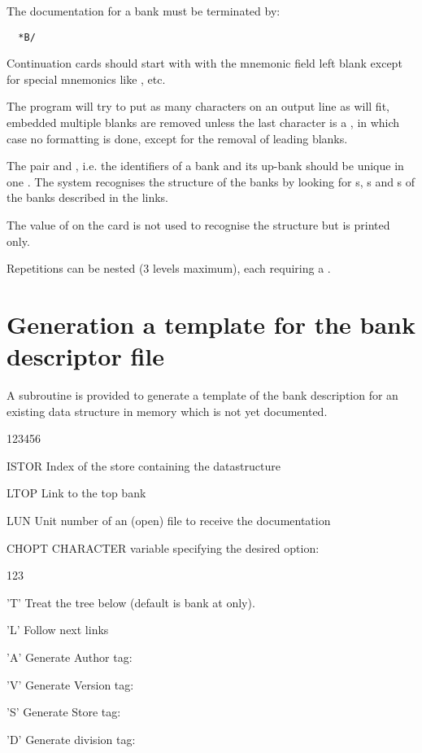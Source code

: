 The documentation for a bank must be terminated by:
\begin{verbatim}
  *B/
\end{verbatim}
 
\begin{Notes}
\item Continuation cards should start with  with the mnemonic field
      left blank except for special mnemonics like , 
       etc.
\item The program will try to put as many characters on an output line as
      will fit, embedded multiple blanks are removed unless the last 
      character is a , in
      which case no formatting is done, except for the removal of leading blanks.
\item The pair  and , i.e. the identifiers of a bank and
      its up-bank should be unique in one \RZfile. 
      The system recognises the structure of the banks by looking for 
      s, s and s of the banks described in the links. 
\item The value of  on the card 
      is not used to recognise the structure but is printed only.
\item Repetitions can be nested (3 levels maximum), 
      each  requiring a .
\end{Notes}
 
\section{Generation a template for the bank descriptor file}
\label{sec:dzdocdzdtmp}  
 
A subroutine is provided to generate a template of the bank
description for an existing
data structure in memory which is not yet documented.
 
 
\Idesc
\begin{DLtt}{123456}
\item[ISTOR] Index of the store containing the datastructure
\item[LTOP]  Link to the top bank
\item[LUN]   Unit number of an (open) file to receive the documentation
\item[CHOPT] CHARACTER variable specifying the desired option:
\begin{DLtt}{123}
\item['T'] Treat the tree below  
           (default is bank at  only).
\item['L'] Follow next links
\item['A'] Generate Author tag: 
\item['V'] Generate Version tag: 
\item['S'] Generate Store tag:   
\item['D'] Generate division tag: 
\end{DLtt} 
\end{DLtt} 
 
